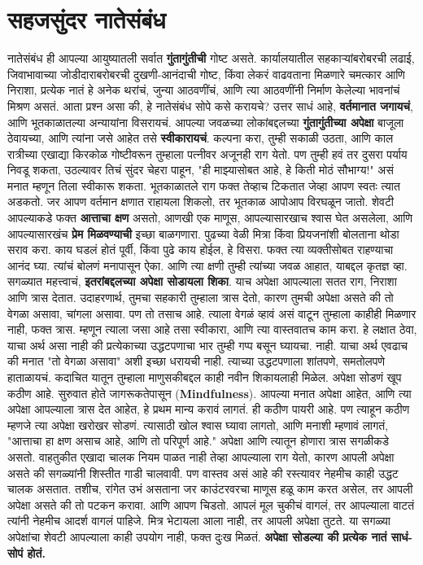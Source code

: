  \chapter{सहजसुंदर नातेसंबंध}
नातेसंबंध ही आपल्या आयुष्यातली सर्वात \textbf{गुंतागुंतीची} गोष्ट असते. कार्यालयातील सहकाऱ्यांबरोबरची लढाई, जिवाभावाच्या जोडीदाराबरोबरची दुखणी-आनंदाची गोष्ट, किंवा लेकरं वाढवताना मिळणारे चमत्कार आणि निराशा,  प्रत्येक नातं हे अनेक थरांचं, जुन्या आठवणींचं, आणि त्या आठवणींनी निर्माण केलेल्या भावनांचं मिश्रण असतं.
आता प्रश्न असा की,  हे नातेसंबंध सोपे कसे करायचे? उत्तर साधं आहे,  \textbf{वर्तमानात जगायचं}, आणि भूतकाळातल्या अन्यायांना विसरायचं. आपल्या जवळच्या लोकांबद्दलच्या \textbf{गुंतागुंतीच्या अपेक्षा} बाजूला ठेवायच्या, आणि त्यांना जसे आहेत तसे \textbf{स्वीकारायचं}.
कल्पना करा,  तुम्ही सकाळी उठता, आणि काल रात्रीच्या एखाद्या किरकोळ गोष्टीवरून तुम्हाला पत्नीवर अजूनही राग येतो. पण तुम्ही हवं तर दुसरा पर्याय निवडू शकता,  उठल्यावर तिचं सुंदर चेहरा पाहून, "ही माझ्यासोबत आहे, हे किती मोठं सौभाग्य!" असं मनात म्हणून तिला स्वीकारू शकता. भूतकाळातले राग फक्त तेव्हाच टिकतात जेव्हा आपण स्वतः त्यात अडकतो. जर आपण वर्तमान क्षणात राहायला शिकलो, तर भूतकाळ आपोआप विरघळून जातो.
 शेवटी आपल्याकडे फक्त \textbf{आत्ताचा क्षण} असतो,  आणखी एक माणूस, आपल्यासारखाच श्वास घेत असलेला, आणि आपल्यासारखंच \textbf{प्रेम मिळवण्याची} इच्छा बाळगणारा.
पुढच्या वेळी मित्रा किंवा प्रियजनांशी बोलताना थोडा सराव करा. काय घडलं होतं पूर्वी, किंवा पुढे काय होईल, 
 हे विसरा. फक्त त्या व्यक्तीसोबत राहण्याचा आनंद घ्या. त्यांचं बोलणं मनापासून ऐका. आणि त्या क्षणी तुम्ही त्यांच्या जवळ आहात, याबद्दल कृतज्ञ व्हा.
सगळ्यात महत्त्वाचं,  \textbf{इतरांबद्दलच्या अपेक्षा सोडायला शिका}. याच अपेक्षा आपल्याला सतत राग, निराशा आणि त्रास देतात. उदाहरणार्थ, तुमचा सहकारी तुम्हाला त्रास देतो, कारण तुमची अपेक्षा असते की तो वेगळा असावा, चांगला असावा. पण तो तसाच आहे. त्याला वेगळं व्हावं असं वाटून तुम्हाला काहीही मिळणार नाही, 
 फक्त त्रास. म्हणून त्याला जसा आहे तसा स्वीकारा, आणि त्या वास्तवातच काम करा.
हे लक्षात ठेवा,  याचा अर्थ असा नाही की प्रत्येकाच्या उद्धटपणाचा भार तुम्ही गप्प बसून घ्यायचा. नाही. याचा अर्थ एवढाच की मनात "तो वेगळा असावा" अशी इच्छा धरायची नाही. त्याच्या उद्धटपणाला शांतपणे, समतोलपणे हाताळायचं. कदाचित यातून तुम्हाला माणुसकीबद्दल काही नवीन शिकायलाही मिळेल.
अपेक्षा सोडणं खूप कठीण आहे. सुरुवात होते जागरूकतेपासून (\textbf{Mindfulness}). आपल्या मनात अपेक्षा आहेत, आणि त्या अपेक्षा आपल्याला त्रास देत आहेत, हे प्रथम मान्य करावं लागतं. ही कठीण पायरी आहे. पण त्याहून कठीण म्हणजे त्या अपेक्षा खरोखर सोडणं. त्यासाठी खोल श्वास घ्यावा लागतो, आणि मनाशी म्हणावं लागतं,  "आत्ताचा हा क्षण असाच आहे, आणि तो परिपूर्ण आहे."
अपेक्षा आणि त्यातून होणारा त्रास सगळीकडे असतो. वाहतुकीत एखादा चालक नियम पाळत नाही तेव्हा आपल्याला राग येतो,  कारण आपली अपेक्षा असते की सगळ्यांनी शिस्तीत गाडी चालवावी. पण वास्तव असं आहे
 की रस्त्यावर नेहमीच काही उद्धट चालक असतात. तशीच, रांगेत उभं असताना जर काउंटरवरचा माणूस हळू काम करत असेल, तर आपली अपेक्षा असते की तो पटकन करावा. आणि आपण चिडतो. आपलं मूल चुकीचं वागलं, तर आपल्याला वाटतं त्यांनी नेहमीच आदर्श वागलं पाहिजे. मित्र भेटायला आला नाही, तर आपली अपेक्षा तुटते.
या सगळ्या अपेक्षांचा शेवटी आपल्याला काही उपयोग नाही,  फक्त दुःख मिळतं. \textbf{अपेक्षा सोडल्या की
 प्रत्येक नातं साधं-सोपं होतं.}
